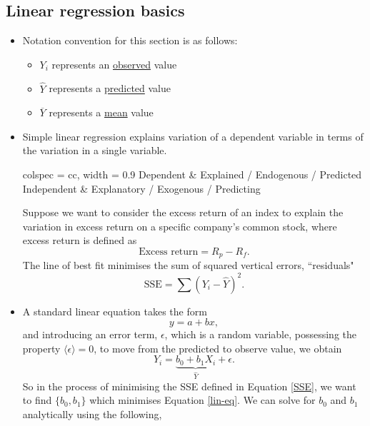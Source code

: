 \documentclass[../notes_compiled.tex]{subfiles}
\begin{document}
\subsection{Linear regression basics}
\begin{itemize}
\item[Note:] Notation convention for this section is as follows:
\begin{itemize}
\item $Y_{i}$ represents an \underline{observed} value
\item $\widehat{Y}$ represents a \underline{predicted} value
\item $\overline{Y}$ represents a \underline{mean} value
\end{itemize}
\item Simple linear regression explains variation of a dependent variable in terms of the variation in a single variable. 
\begin{table}[H]
\centering
\begin{tblr}{colspec = {cc}, width = 0.9\textwidth}
Dependent & Explained / Endogenous / Predicted\\
Independent & Explanatory / Exogenous / Predicting
\end{tblr}
\end{table}
Suppose we want to consider the excess return of an index to explain the variation in excess return on a specific company's common stock, where excess return is defined as
\begin{equation}
\text{Excess return} = R_{p}-R_{f}.
\end{equation}
The line of best fit minimises the sum of squared vertical errors, ``residuals"
\begin{equation}
\mathrm{SSE} = \sum(Y_{i}-\widehat{Y})^{2}. \label{SSE}
\end{equation}
\item A standard linear equation takes the form
\begin{equation}
y=a+bx,
\end{equation}
and introducing an error term, $\epsilon$, which is a random variable, possessing the property $\langle\epsilon\rangle=0$, to move from the predicted to observe value, we obtain
\begin{equation}
Y_{i} = \underbrace{b_{0}+b_{1}X_{i}}_{\widehat{Y}}+\epsilon. \label{lin-eq}
\end{equation}
So in the process of minimising the SSE defined in Equation \ref{SSE}, we want to find $\{b_{0},b_{1}\}$ which minimises Equation \ref{lin-eq}. We can solve for $b_{0}$ and $b_{1}$ analytically using the following, 

\end{itemize}
\end{document}
